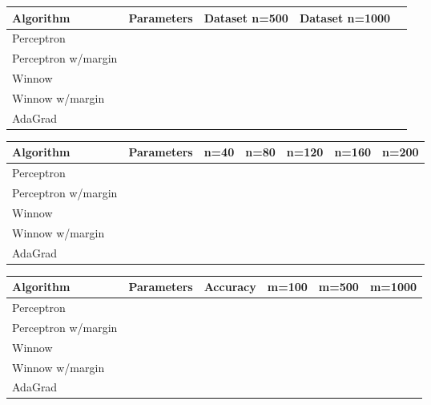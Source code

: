 
\usepackage{amsmath,amssymb,url,color,multirow,array}
\sloppy
\newcommand{\ignore}[1]{}

\oddsidemargin 0in
\evensidemargin 0in
\textwidth 6.5in
\topmargin -0.5in
\textheight 9.0in


  \begin{center}
    \begin{tabular}{|p{3.0cm}|p{2.2cm}|p{2.5cm}|p{2.5cm}|p{2.5cm}|}
      \hline
      Algorithm               &  Parameters & Dataset n=500 & Dataset n=1000\\\hline\hline
      Perceptron              &             &               &      \\\hline
      Perceptron w/margin     &             &               &      \\\hline
      Winnow                  &             &               &      \\\hline
      Winnow w/margin         &             &               &      \\\hline
      AdaGrad                 &             &               &      \\\hline
    \end{tabular}
  \end{center}
  
  \begin{center}
    \begin{tabular}{|p{3.0cm}|p{2.2cm}|p{1cm}|p{1cm}|p{1cm}|p{1cm}|p{1cm}|}
      \hline
      Algorithm             &  Parameters & n=40 & n=80 & n=120 & n=160 & n=200\\\hline\hline
      Perceptron            &             &      &      &       &       &      \\\hline
      Perceptron w/margin   &             &      &      &       &       &      \\\hline
      Winnow                &             &      &      &       &       &      \\\hline
      Winnow w/margin       &             &      &      &       &       &      \\\hline
      AdaGrad               &             &      &      &       &       &      \\\hline
    \end{tabular}
  \end{center}
  
\begin{center}
  \begin{tabular}{|p{4cm}|p{2.3cm}|p{2cm}|p{1.5cm}|p{1.5cm}|p{1.5cm}|}
\hline
 Algorithm      &  Parameters & Accuracy & m=100 & m=500 & m=1000\\\hline\hline
 Perceptron     & & & & &\\\hline
 Perceptron w/margin & & & & &\\\hline
 Winnow              & & & & &\\\hline
 Winnow w/margin     & & & & &\\\hline
 AdaGrad & & & & & \\\hline
\end{tabular}
\end{center}

    


